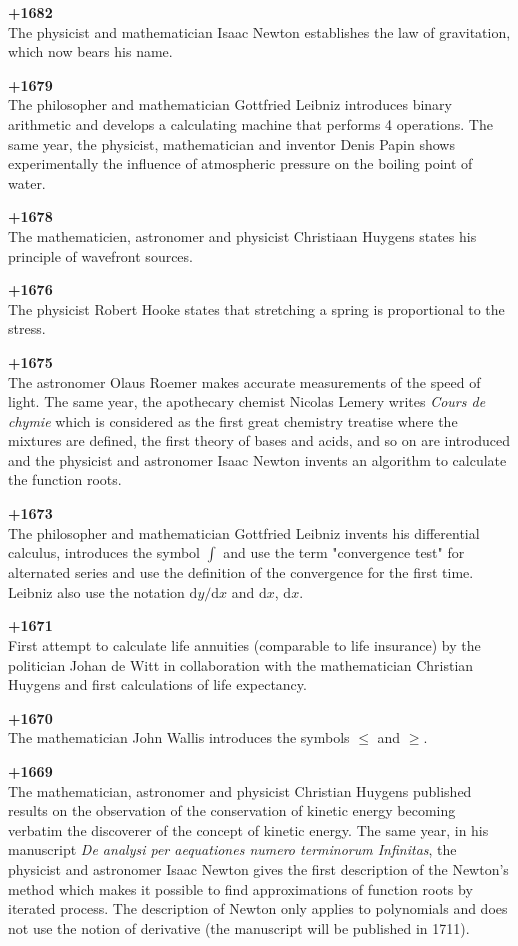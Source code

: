 \textbf{+1682}\\
The physicist and mathematician Isaac Newton establishes the law of gravitation, which now bears his name.

\textbf{+1679}\\
The philosopher and mathematician Gottfried Leibniz introduces binary arithmetic and develops a calculating machine that performs 4 operations. The same year, the physicist, mathematician and inventor Denis Papin shows experimentally the influence of atmospheric pressure on the boiling point of water.

\textbf{+1678}\\
The mathematicien, astronomer and physicist Christiaan Huygens states his principle of wavefront sources.

\textbf{+1676}\\
The physicist Robert Hooke states that stretching a spring is proportional to the stress.

\textbf{+1675}\\
The astronomer Olaus Roemer makes accurate measurements of the speed of light. The same year, the apothecary chemist Nicolas Lemery writes \textit{Cours de chymie} which is considered as the first great chemistry treatise where the mixtures are defined, the first theory of bases and acids, and so on are introduced and the physicist and astronomer Isaac Newton invents an algorithm to calculate the function roots.

\textbf{+1673}\\
The philosopher and mathematician Gottfried Leibniz invents his differential calculus, introduces the symbol $\int$ and use the term "convergence test" for alternated series and use the definition of the convergence for the first time. Leibniz also use the notation $\mathrm{d}y/\mathrm{d}x$ and $\mathrm{d}x$, $\mathrm{d}x$.

\textbf{+1671}\\
First attempt to calculate life annuities (comparable to life insurance) by the politician Johan de Witt in collaboration with the mathematician Christian Huygens and first calculations of life expectancy.

\textbf{+1670}\\
The mathematician John Wallis introduces the symbols $\le$ and $\ge$.

\textbf{+1669}\\
The mathematician, astronomer and physicist Christian Huygens published results on the observation of the conservation of kinetic energy becoming verbatim the discoverer of the concept of kinetic energy. The same year, in his manuscript \textit{De analysi per aequationes numero terminorum Infinitas}, the physicist and astronomer Isaac Newton gives the first description of the Newton's method which makes it possible to find approximations of function roots by iterated process. The description of Newton only applies to polynomials and does not use the notion of derivative (the manuscript will be published in 1711).

